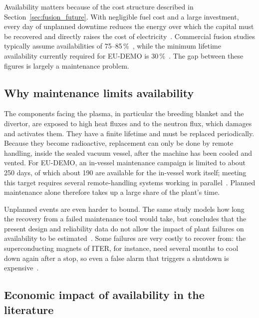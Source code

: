 \documentclass{book}
\begin{document}
Availability matters because of the cost structure described in
Section~\ref{sec:fusion_future}. With negligible fuel cost and a large
investment, every day of unplanned downtime reduces the energy over which the
capital must be recovered and directly raises the cost of
electricity~\cite{Lindley2023}. Commercial fusion studies typically assume
availabilities of 75--85\,\%~\cite{schwartz2024maintenance}, while the minimum
lifetime availability currently required for EU-DEMO is
30\,\%~\cite{farquhar2019rm}. The gap between these figures is largely a
maintenance problem.

\subsection{Why maintenance limits availability}

The components facing the plasma, in particular the breeding blanket and the
divertor, are exposed to high heat fluxes and to the neutron flux, which
damages and activates them. They have a finite lifetime and must be replaced
periodically. Because they become radioactive, replacement can only be done
by remote handling, inside the sealed vacuum vessel, after the machine has
been cooled and vented. For EU-DEMO, an in-vessel maintenance campaign is
limited to about 250 days, of which about 190 are available for the in-vessel
work itself; meeting this target requires several remote-handling systems
working in parallel~\cite{farquhar2019rm}. Planned maintenance alone therefore
takes up a large share of the plant's time.

Unplanned events are even harder to bound. The same study models how long the
recovery from a failed maintenance tool would take, but concludes that the
present design and reliability data do not allow the impact of plant failures
on availability to be estimated~\cite{farquhar2019rm}. Some failures are very
costly to recover from: the superconducting magnets of ITER, for instance,
need several months to cool down again after a stop, so even a false alarm
that triggers a shutdown is expensive~\cite{destino2021lofa}.

\subsection{Economic impact of availability in the literature}
\label{sec:availability_economics}
\end{document}
